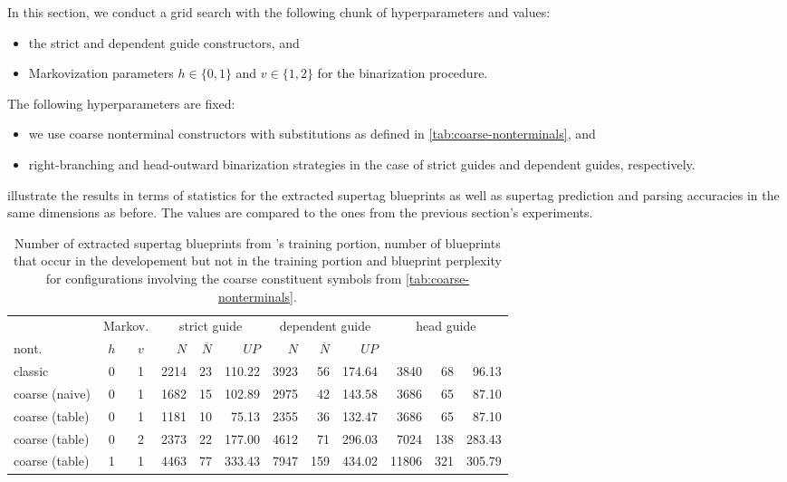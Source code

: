 \documentclass[../../document.tex]{subfiles}
\begin{document}
    In this section, we conduct a grid search with the following chunk of hyperparameters and values:
    \begin{itemize}
        \item the strict and dependent guide constructors, and
        \item Markovization parameters \(h \in \{0,1\}\) and \(v \in \{1,2\}\) for the binarization procedure.
    \end{itemize}
    The following hyperparameters are fixed:
    \begin{itemize}
        \item we use coarse nonterminal constructors with substitutions as defined in \cref{tab:coarse-nonterminals}, and
        \item right-branching and head-outward binarization strategies in the case of strict guides and dependent guides, respectively.
    \end{itemize}
     illustrate the results in terms of statistics for the extracted supertag blueprints as well as supertag prediction and parsing accuracies in the same dimensions as before.
    The values are compared to the ones from the previous section's experiments.

    \begin{table}
        \caption{\label{tbl:gridsearch:coarse:1}
        Number of extracted supertag blueprints from \negra{}'s training portion, number of blueprints that occur in the developement but not in the training portion and blueprint perplexity for configurations involving the coarse constituent symbols from \cref{tab:coarse-nonterminals}.
        }
        \centering
        \vspace{.2cm}
        \begin{tabular}{lcc|rrr|rrr|rrr}
            \toprule
& \multicolumn{2}{c|}{Markov.}         & \multicolumn{3}{c|}{strict guide} &  \multicolumn{3}{c|}{dependent guide} &  \multicolumn{3}{c|}{head guide} \\
nont.           & \(h\) & \(v\) & $N$ & $\overline{N}$ & $\mathit{UP}$ & $N$ & $\overline{N}$ & $\mathit{UP}$  \\ \hline \rowcolor{black!10}
classic        & 0 & 1 & 2214 & 23 & 110.22 & 3923 & 56 & 174.64 & 3840 & 68 & 96.13 \\\rowcolor{black!10}
coarse (naive) & 0 & 1 & 1682 & 15 & 102.89 & 2975 & 42 & 143.58 & 3686 & 65 & 87.10 \\\hline
coarse (table) & 0 & 1 & 1181 & 10 & 75.13 & 2355 & 36 & 132.47 & 3686 & 65 & 87.10 \\
coarse (table) & 0 & 2 & 2373 & 22 & 177.00 & 4612 & 71 & 296.03 & 7024 & 138 & 283.43 \\
coarse (table) & 1 & 1 & 4463 & 77 & 333.43 & 7947 & 159 & 434.02 & 11806 & 321 & 305.79 \\
\bottomrule
        \end{tabular}
    \end{table}
\end{document}
